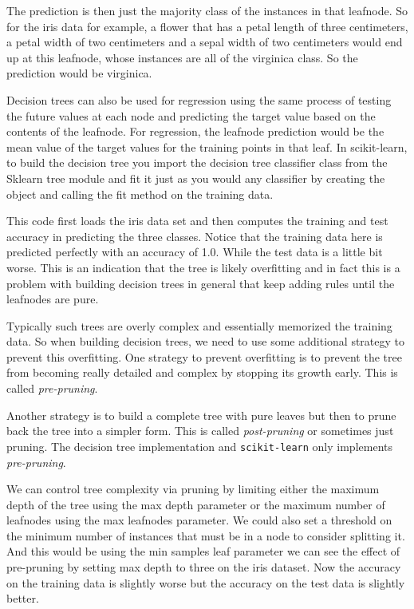 \begin{multicols}{2}
The prediction is then just the majority class of the instances in that leafnode. So for the iris data for example, a flower that has a petal length of three centimeters, a petal width of two centimeters and a sepal width of two centimeters would end up at this leafnode, whose instances are all of the virginica class. So the prediction would be virginica. 

Decision trees can also be used for regression using the same process of testing the future values at each node and predicting the target value based on the contents of the leafnode. For regression, the leafnode prediction would be the mean value of the target values for the training points in that leaf. In scikit-learn, to build the decision tree you import the decision tree classifier class from the Sklearn tree module and fit it just as you would any classifier by creating the object and calling the fit method on the training data. 

This code first loads the iris data set and then computes the training and test accuracy in predicting the three classes. Notice that the training data here is predicted perfectly with an accuracy of 1.0. While the test data is a little bit worse. This is an indication that the tree is likely overfitting and in fact this is a problem with building decision trees in general that keep adding rules until the leafnodes are pure. 

Typically such trees are overly complex and essentially memorized the training data. So when building decision trees, we need to use some additional strategy to prevent this overfitting. One strategy to prevent overfitting is to prevent the tree from becoming really detailed and complex by stopping its growth early. This is called \emph{pre-pruning}. 

Another strategy is to build a complete tree with pure leaves but then to prune back the tree into a simpler form. This is called \emph{post-pruning} or sometimes just pruning. The decision tree implementation and \texttt{scikit-learn} only implements \emph{pre-pruning}. 

We can control tree complexity via pruning by limiting either the maximum depth of the tree using the max depth parameter or the maximum number of leafnodes using the max leafnodes parameter. We could also set a threshold on the minimum number of instances that must be in a node to consider splitting it. And this would be using the min samples leaf parameter we can see the effect of pre-pruning by setting max depth to three on the iris dataset. Now the accuracy on the training data is slightly worse but the accuracy on the test data is slightly better. 


\end{multicols}
